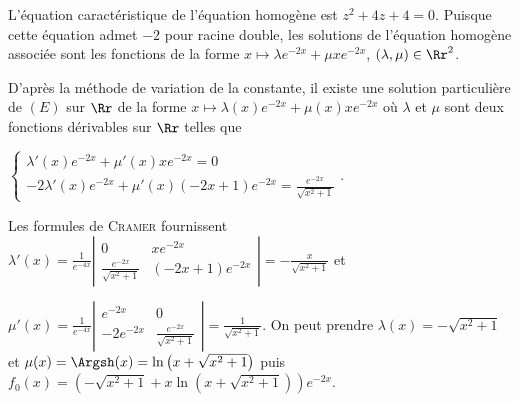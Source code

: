 {\begin{enumerate}
{L'équation caractéristique de l'équation homogène est $z^2+4z+4=0$. Puisque cette équation admet $-2$ pour racine double, les solutions de l'équation homogène associée sont les fonctions de la forme $x\mapsto\lambda e^{-2x}+\mu xe^{-2x}$, $(\lambda,\mu)\in\Rr^2$.

D'après la méthode de variation de la constante, il existe une solution particulière de $(E)$ sur $\Rr$ de la forme $x\mapsto\lambda(x)e^{-2x}+\mu(x)xe^{-2x}$ où $\lambda$ et $\mu$ sont deux fonctions dérivables sur $\Rr$ telles que 

\begin{center}
$\left\{
\begin{array}{l}
\lambda'(x)e^{-2x}+\mu'(x)xe^{-2x}=0\\
-2\lambda'(x)e^{-2x}+\mu'(x)(-2x+1)e^{-2x}= \frac{e^{-2x}}{\sqrt{x^2+1}}
\end{array}
\right.$.
\end{center}

Les formules de \textsc{Cramer} fournissent $\lambda'(x)= \frac{1}{e^{-4x}}\left|
\begin{array}{cc}
0&xe^{-2x}\\
 \frac{e^{-2x}}{\sqrt{x^2+1}}&(-2x+1)e^{-2x}
\end{array}
\right|=- \frac{x}{\sqrt{x^2+1}}$ et 

$\mu'(x)= \frac{1}{e^{-4x}}\left|
\begin{array}{cc}
e^{-2x}&0\\
-2e^{-2x}& \frac{e^{-2x}}{\sqrt{x^2+1}}
\end{array}
\right|= \frac{1}{\sqrt{x^2+1}}$. On peut prendre $\lambda(x)=-\sqrt{x^2+1}$ et $\mu(x)=\Argsh(x)=\ln\left(x+\sqrt{x^2+1}\right)$ puis $f_0(x)=\left(-\sqrt{x^2+1}+x\ln\left(x+\sqrt{x^2+1}\right)\right)e^{-2x}$.

\begin{center}
\end{center}}
\end{enumerate}
}